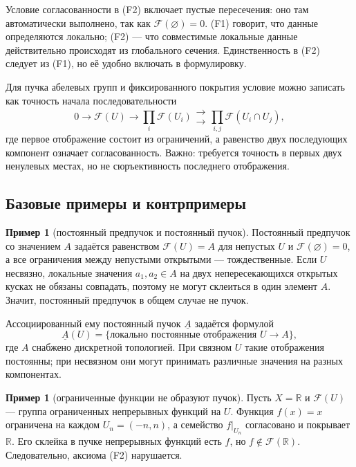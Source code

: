\documentclass[11pt,b5paper,oneside]{article}
\newcommand{\F}{\mathscr F}
\newcommand{\R}{\mathbb R}
\theoremstyle{plain}
\theoremstyle{definition}
\newtheorem{exm}[thm]{Пример}
\theoremstyle{remark}
\begin{document}
Условие согласованности в (F2) включает пустые пересечения: оно там
автоматически выполнено, так как $\F(\varnothing)=0$. (F1) говорит, что
данные определяются локально; (F2) --- что совместимые локальные данные
действительно происходят из глобального сечения. Единственность в (F2)
следует из (F1), но её удобно включать в формулировку.

Для пучка абелевых групп и фиксированного покрытия условие можно записать
как точность начала последовательности
\[
  0\longrightarrow\F(U)\longrightarrow
  \prod_i\F(U_i)\mathrel{\substack{\longrightarrow\\[-.6ex]\longrightarrow}}
  \prod_{i,j}\F(U_i\cap U_j),
\]
где первое отображение состоит из ограничений, а равенство двух
последующих компонент означает согласованность. Важно: требуется
точность в первых двух ненулевых местах, но не сюръективность последнего
отображения.

\subsection{Базовые примеры и контрпримеры}
\begin{exm}[постоянный предпучок и постоянный пучок]
Постоянный предпучок со значением $A$ задаётся равенством
$\F(U)=A$ для непустых $U$ и $\F(\varnothing)=0$, а все ограничения
между непустыми открытыми --- тождественные. Если $U$ несвязно, локальные
значения $a_1,a_2\in A$ на двух непересекающихся открытых кусках не обязаны
совпадать, поэтому не могут склеиться в один элемент $A$. Значит,
постоянный предпучок в общем случае не пучок.

Ассоциированный ему постоянный пучок $\underline A$ задаётся формулой
\[
  \underline A(U)=\{\text{локально постоянные отображения }U\to A\},
\]
где $A$ снабжено дискретной топологией. При связном $U$ такие отображения
постоянны; при несвязном они могут принимать различные значения на
разных компонентах.
\end{exm}

\begin{exm}[ограниченные функции не образуют пучок]
Пусть $X=\R$ и $\F(U)$ --- группа ограниченных непрерывных функций на
$U$. Функция $f(x)=x$ ограничена на каждом $U_n=(-n,n)$, а семейство
$f|_{U_n}$ согласовано и покрывает $\R$. Его склейка в пучке непрерывных
функций есть $f$, но $f\notin\F(\R)$. Следовательно, аксиома (F2)
нарушается.
\end{exm}
\end{document}
